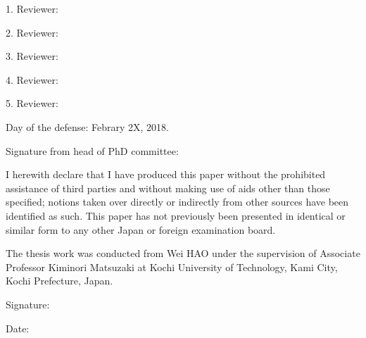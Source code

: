 
\newpage
\vspace{10mm}
1. Reviewer: 

\vspace{10mm}
2. Reviewer:

\vspace{10mm}
3. Reviewer:

\vspace{10mm}
4. Reviewer:

\vspace{10mm}
5. Reviewer:


\vspace{40mm}
Day of the defense: Febrary 2X, 2018.

\vspace{20mm}\hspace{70mm}

Signature from head of PhD committee:


\newpage

\begin{declaration}
	
	I herewith declare that I have produced this paper without the prohibited
	assistance of third parties and without making use of aids other than those
	specified; notions taken over directly or indirectly from other sources have
	been identified as such. This paper has not previously been presented in
	identical or similar form to any other Japan or foreign examination board.
	
	The thesis work was conducted from Wei HAO under the supervision of Associate
	Professor Kiminori Matsuzaki at Kochi University of Technology, Kami City, Kochi
	Prefecture, Japan.
	
	\vspace{70mm}
	
	\hspace{80mm} Signature:
	
	\hspace{80mm} Date:
	
\end{declaration} 


